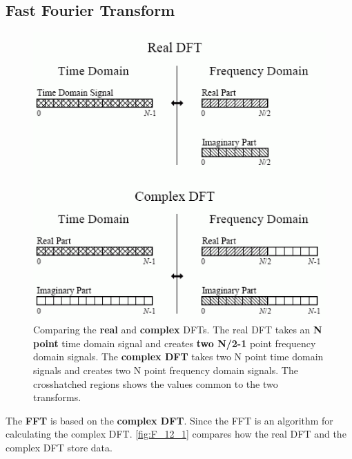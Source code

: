 \documentclass[a4paper,12pt]{article}
\begin{document}
\subsection{Fast Fourier Transform}

\begin{figure}[h!]
  \label{fig:F_12_1}
  \centering
	\includegraphics[width=\textwidth, keepaspectratio=true]{F_12_1}
\caption{Comparing the \textbf{real} and \textbf{complex} DFTs. 
The real DFT takes an \textbf{N point} time domain signal and creates \textbf{two N/2-1} point frequency domain signals. The \textbf{complex DFT} takes two N point time domain signals and creates two N point frequency domain signals. The crosshatched regions shows
the values common to the two transforms.}
\end{figure}


The \textbf{FFT} is based on the \textbf{complex DFT}. 
Since the FFT is an algorithm for calculating the complex DFT. \autoref{fig:F_12_1} compares how the real DFT and the complex DFT store data.\\
\end{document}
